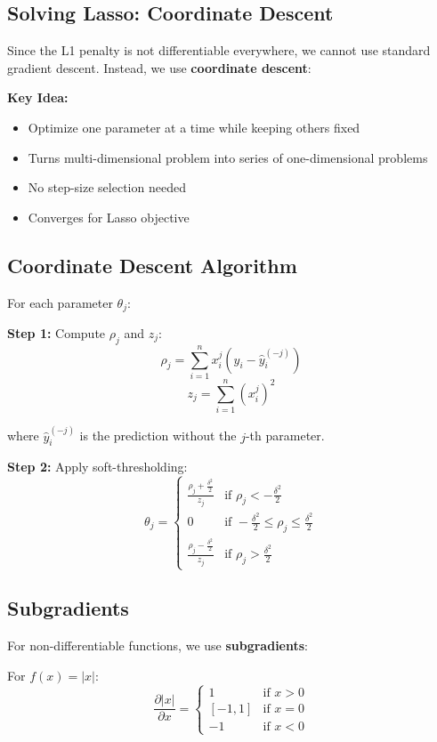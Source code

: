 \documentclass{article}
\begin{document}
\subsection{Solving Lasso: Coordinate Descent}

Since the L1 penalty is not differentiable everywhere, we cannot use standard gradient descent. Instead, we use \textbf{coordinate descent}:

\textbf{Key Idea:}
\begin{itemize}
    \item Optimize one parameter at a time while keeping others fixed
    \item Turns multi-dimensional problem into series of one-dimensional problems
    \item No step-size selection needed
    \item Converges for Lasso objective
\end{itemize}

\subsection{Coordinate Descent Algorithm}

For each parameter $\theta_j$:

\textbf{Step 1:} Compute $\rho_j$ and $z_j$:
$$\rho_j = \sum_{i=1}^n x_i^j(y_i - \hat{y}_i^{(-j)})$$
$$z_j = \sum_{i=1}^n (x_i^j)^2$$

where $\hat{y}_i^{(-j)}$ is the prediction without the $j$-th parameter.

\textbf{Step 2:} Apply soft-thresholding:
$$\theta_j = \begin{cases}
\frac{\rho_j + \frac{\delta^2}{2}}{z_j} & \text{if } \rho_j < -\frac{\delta^2}{2} \\
0 & \text{if } -\frac{\delta^2}{2} \leq \rho_j \leq \frac{\delta^2}{2} \\
\frac{\rho_j - \frac{\delta^2}{2}}{z_j} & \text{if } \rho_j > \frac{\delta^2}{2}
\end{cases}$$

\subsection{Subgradients}

For non-differentiable functions, we use \textbf{subgradients}:

For $f(x) = |x|$:
$$\frac{\partial |x|}{\partial x} = \begin{cases}
1 & \text{if } x > 0 \\
[-1, 1] & \text{if } x = 0 \\
-1 & \text{if } x < 0
\end{cases}$$
\end{document}
